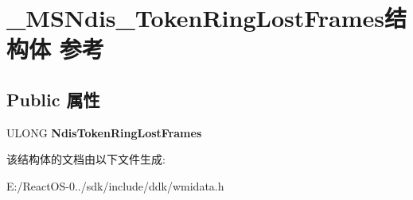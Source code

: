 \hypertarget{struct___m_s_ndis___token_ring_lost_frames}{}\section{\+\_\+\+M\+S\+Ndis\+\_\+\+Token\+Ring\+Lost\+Frames结构体 参考}
\label{struct___m_s_ndis___token_ring_lost_frames}
\subsection*{Public 属性}
\begin{DoxyCompactItemize}
\item 
\mbox{\label{struct___m_s_ndis___token_ring_lost_frames_ad519a5a9d700eec8f178c757794a46e8}} 
U\+L\+O\+NG {\bfseries Ndis\+Token\+Ring\+Lost\+Frames}
\end{DoxyCompactItemize}


该结构体的文档由以下文件生成\+:\begin{DoxyCompactItemize}
\item 
E\+:/\+React\+O\+S-\/0../sdk/include/ddk/wmidata.\+h\end{DoxyCompactItemize}
